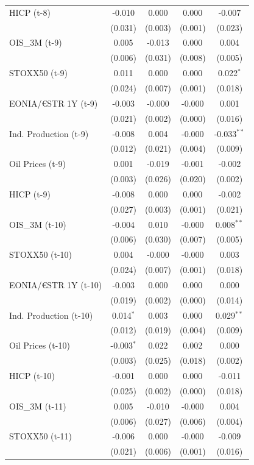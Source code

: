 \begin{longtable}[t]{lcccc}
HICP (t-8) & -0.010 & 0.000 & 0.000 & -0.007\\
 & (0.031) & (0.003) & (0.001) & (0.023)\\
OIS\_3M (t-9) & 0.005 & -0.013 & 0.000 & 0.004\\
 & (0.006) & (0.031) & (0.008) & (0.005)\\
STOXX50 (t-9) & 0.011 & 0.000 & 0.000 & 0.022$^{*}$\\
 & (0.024) & (0.007) & (0.001) & \vphantom{1} (0.018)\\
EONIA/€STR 1Y (t-9) & -0.003 & -0.000 & -0.000 & 0.001\\
 & (0.021) & (0.002) & (0.000) & (0.016)\\
Ind. Production (t-9) & -0.008 & 0.004 & -0.000 & -0.033$^{**}$\\
 & (0.012) & (0.021) & (0.004) & (0.009)\\
Oil Prices (t-9) & 0.001 & -0.019 & -0.001 & -0.002\\
 & (0.003) & (0.026) & (0.020) & (0.002)\\
HICP (t-9) & -0.008 & 0.000 & 0.000 & -0.002\\
 & (0.027) & (0.003) & (0.001) & (0.021)\\
OIS\_3M (t-10) & -0.004 & 0.010 & -0.000 & 0.008$^{**}$\\
 & (0.006) & (0.030) & (0.007) & (0.005)\\
STOXX50 (t-10) & 0.004 & -0.000 & -0.000 & 0.003\\
 & (0.024) & (0.007) & (0.001) & (0.018)\\
EONIA/€STR 1Y (t-10) & -0.003 & 0.000 & 0.000 & 0.000\\
 & (0.019) & (0.002) & (0.000) & (0.014)\\
Ind. Production (t-10) & 0.014$^{*}$ & 0.003 & 0.000 & 0.029$^{**}$\\
 & (0.012) & (0.019) & (0.004) & (0.009)\\
Oil Prices (t-10) & -0.003$^{*}$ & 0.022 & 0.002 & 0.000\\
 & (0.003) & (0.025) & (0.018) & (0.002)\\
HICP (t-10) & -0.001 & 0.000 & 0.000 & -0.011\\
 & (0.025) & (0.002) & (0.000) & (0.018)\\
OIS\_3M (t-11) & 0.005 & -0.010 & -0.000 & 0.004\\
 & (0.006) & (0.027) & (0.006) & (0.004)\\
STOXX50 (t-11) & -0.006 & 0.000 & -0.000 & -0.009\\
 & (0.021) & (0.006) & (0.001) & (0.016)\\

\end{longtable}
